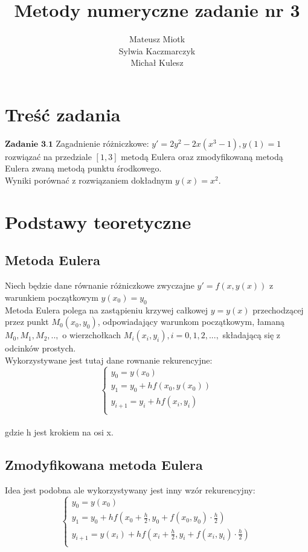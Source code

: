 \documentclass[11pt]{article} %
\title{Metody numeryczne zadanie nr 3}
\author{Mateusz Miotk \\  Sylwia Kaczmarczyk \\ Michał Kulesz}
\begin{document}
\maketitle

\section{Treść zadania}
$\textbf{Zadanie 3.1} $ Zagadnienie różniczkowe: $y'=2y^2 -2x(x^3 - 1) , y(1)=1 $\\
rozwiązać na przedziale $[1,3]$ metodą Eulera oraz zmodyfikowaną metodą Eulera zwaną metodą punktu środkowego.\\
Wyniki porównać z rozwiązaniem dokładnym $y(x) = x^2$.

\section{Podstawy teoretyczne}
\subsection{Metoda Eulera}
Niech będzie dane równanie różniczkowe zwyczajne $y' = f(x,y(x))$ z warunkiem początkowym $y(x_0) = y_0$\\
Metoda Eulera polega na zastąpieniu krzywej całkowej $y = y(x)$ przechodzącej przez punkt $M_0(x_0,y_0)$, odpowiadający 
warunkom początkowym, łamaną $M_0,M_1,M_2,..,$ o wierzchołkach $M_i(x_i,y_i) , i=0,1,2,...,$ składającą się z odcinków prostych.\\
Wykorzystywane jest tutaj dane rownanie rekurencyjne: \\
$$
 \left\{ \begin{array}{ll}
 y_0 = y(x_0)\\
 y_1 = y_0+hf(x_0,y(x_0))\\
y_{i+1} = y_i + hf(x_i,y_i)\\
\end{array} \right.
$$
\\gdzie h jest krokiem na osi x.\\
\subsection{Zmodyfikowana metoda Eulera}
Idea jest podobna ale wykorzystywany jest inny wzór rekurencyjny: \\
$$
 \left\{ \begin{array}{ll}
 y_0 = y(x_0)\\
 y_1 = y_0+hf(x_0 + \frac{h}{2},y_0 + f(x_0,y_0)\cdot\frac{h}{2})\\
 y_{i+1} = y(x_i)+hf(x_i + \frac{h}{2},y_i + f(x_i,y_i)\cdot\frac{h}{2})\\
\end{array} \right.
$$
\end{document}
